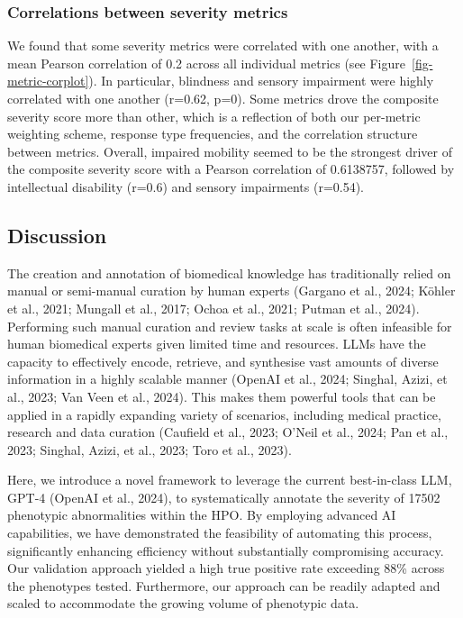 \documentclass[
]{agujournal2019}
\begin{document}
\subsubsection{Correlations between severity
metrics}\label{correlations-between-severity-metrics}

We found that some severity metrics were correlated with one another,
with a mean Pearson correlation of 0.2 across all individual metrics
(see Figure~\ref{fig-metric-corplot}). In particular, blindness and
sensory impairment were highly correlated with one another (r=0.62,
p=0). Some metrics drove the composite severity score more than other,
which is a reflection of both our per-metric weighting scheme, response
type frequencies, and the correlation structure between metrics.
Overall, impaired mobility seemed to be the strongest driver of the
composite severity score with a Pearson correlation of 0.6138757,
followed by intellectual disability (r=0.6) and sensory impairments
(r=0.54).

\subsection{Discussion}\label{discussion}

The creation and annotation of biomedical knowledge has traditionally
relied on manual or semi-manual curation by human experts (Gargano et
al., 2024; Köhler et al., 2021; Mungall et al., 2017; Ochoa et al.,
2021; Putman et al., 2024). Performing such manual curation and review
tasks at scale is often infeasible for human biomedical experts given
limited time and resources. LLMs have the capacity to effectively
encode, retrieve, and synthesise vast amounts of diverse information in
a highly scalable manner (OpenAI et al., 2024; Singhal, Azizi, et al.,
2023; Van Veen et al., 2024). This makes them powerful tools that can be
applied in a rapidly expanding variety of scenarios, including medical
practice, research and data curation (Caufield et al., 2023; O'Neil et
al., 2024; Pan et al., 2023; Singhal, Azizi, et al., 2023; Toro et al.,
2023).

Here, we introduce a novel framework to leverage the current
best-in-class LLM, GPT-4 (OpenAI et al., 2024), to systematically
annotate the severity of 17502 phenotypic abnormalities within the HPO.
By employing advanced AI capabilities, we have demonstrated the
feasibility of automating this process, significantly enhancing
efficiency without substantially compromising accuracy. Our validation
approach yielded a high true positive rate exceeding 88\% across the
phenotypes tested. Furthermore, our approach can be readily adapted and
scaled to accommodate the growing volume of phenotypic data.
\end{document}
